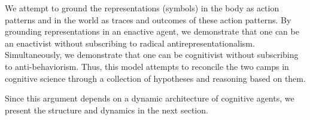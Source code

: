 We attempt to ground the representations (symbols) in the body as action patterns and in the world as traces and outcomes of these action patterns. By grounding representations in an enactive agent, we demonstrate that one can be an enactivist without subscribing to radical antirepresentationalism. Simultaneously, we demonstrate that one can be cognitivist without subscribing to anti-behaviorism.  
Thus, this model attempts to reconcile the two camps in cognitive science through a collection of hypotheses and reasoning based on them. 

Since this argument depends on a dynamic architecture of cognitive agents, we present the structure and dynamics in the next section.

